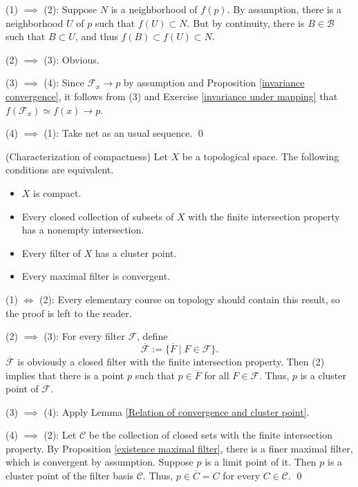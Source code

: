 \documentclass{report}
\begin{document}
\begin{prf}
    (1) \( \implies  \) (2):
    Suppose \( N \) is a neighborhood of \( f(p) \). By assumption, there is a neighborhood \( U \) of \( p \) such that \( f(U) \subset N \). But by continuity, there is \( B \in \mathscr{B} \) such that \( B \subset U \), and thus \( f(B) \subset f(U) \subset N \).

    (2) \( \implies \) (3): Obvious.

    (3) \( \implies \) (4):
    Since \( \mathscr{F}_x \to p \) by assumption and Proposition \ref{invariance convergence}, it follows from (3) and Exercise \ref{invariance under mapping} that \( f(\mathscr{F}_x) \simeq f(x)\to p \).

    (4) \( \implies \) (1): Take net as an usual sequence.
    \qed\end{prf}

\begin{prp}\label{characterize compact} (Characterization of compactness)
    Let \( X \) be a topological space. The following conditions are equivalent.
    \begin{itemize}
        \item[(1)] \( X \) is compact.
        \item[(2)] Every closed collection of subsets of \( X \) with the finite intersection property has a nonempty intersection.
        \item[(3)] Every filter of \( X \) has a cluster point.
        \item[(4)] Every maximal filter is convergent.
    \end{itemize}
\end{prp}
\begin{prf}
    (1) \( \iff \) (2):
    Every elementary course on topology should contain this result, so the proof is left to the reader.

    (2) \( \implies \) (3): For every filter \( \mathscr{F} \), define
    \begin{equation*}
        \overline{\mathscr{F}} := \{\overline{F} \mid F \in \mathscr{F}\}.
    \end{equation*}
    \( \overline{\mathscr{F}} \) is obviously a closed filter with the finite intersection property. Then (2) implies that there is a point \( p \) such that \( p \in \overline{F}\) for all \( F \in \mathscr{F} \). Thus, \( p \) is a cluster point of \( \mathscr{F} \).

    (3) \( \implies \) (4):
    Apply Lemma \ref{Relation of convergence and cluster point}.

    (4) \( \implies \) (2): Let \( \mathscr{C} \) be the collection of closed sets with the finite intersection property. By Proposition \ref{existence maximal filter}, there is a finer maximal filter, which is convergent by assumption. Suppose \( p \) is a limit point of it. Then \( p \) is a cluster point of the filter basis \( \mathscr{C} \). Thus, \( p \in \overline{C} = C \) for every \( C \in \mathscr{C} \).
    \qed\end{prf}
\end{document}
